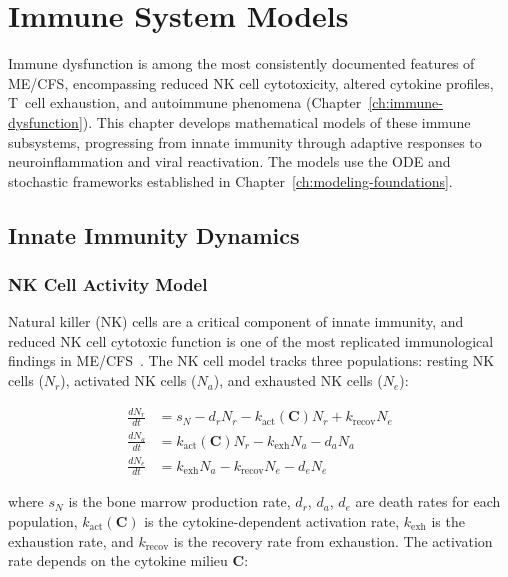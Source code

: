 \chapter{Immune System Models}
\label{ch:immune-system-models}

Immune dysfunction is among the most consistently documented features of ME/CFS, encompassing reduced NK cell cytotoxicity, altered cytokine profiles, T~cell exhaustion, and autoimmune phenomena (Chapter~\ref{ch:immune-dysfunction}). This chapter develops mathematical models of these immune subsystems, progressing from innate immunity through adaptive responses to neuroinflammation and viral reactivation. The models use the ODE and stochastic frameworks established in Chapter~\ref{ch:modeling-foundations}.



\section{Innate Immunity Dynamics}
\label{sec:innate-immunity-models}

\subsection{NK Cell Activity Model}
\label{sec:nk-model}

Natural killer (NK) cells are a critical component of innate immunity, and reduced NK cell cytotoxic function is one of the most replicated immunological findings in ME/CFS~\cite{Hardcastle2016}. The NK cell model tracks three populations: resting NK cells ($N_r$), activated NK cells ($N_a$), and exhausted NK cells ($N_e$):

\begin{align}
\label{eq:nk-dynamics}
\frac{dN_r}{dt} &= s_N - d_r N_r - k_{\text{act}}(\boldsymbol{C}) N_r + k_{\text{recov}} N_e \\
\frac{dN_a}{dt} &= k_{\text{act}}(\boldsymbol{C}) N_r - k_{\text{exh}} N_a - d_a N_a \\
\frac{dN_e}{dt} &= k_{\text{exh}} N_a - k_{\text{recov}} N_e - d_e N_e
\end{align}

where $s_N$ is the bone marrow production rate, $d_r$, $d_a$, $d_e$ are death rates for each population, $k_{\text{act}}(\boldsymbol{C})$ is the cytokine-dependent activation rate, $k_{\text{exh}}$ is the exhaustion rate, and $k_{\text{recov}}$ is the recovery rate from exhaustion. The activation rate depends on the cytokine milieu $\boldsymbol{C}$:

